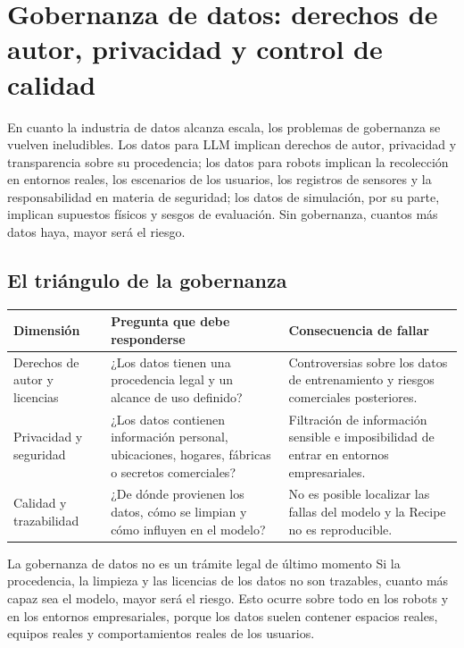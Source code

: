 \documentclass[a4paper]{article}
\begin{document}
\section{Gobernanza de datos: derechos de autor, privacidad y control de calidad}

En cuanto la industria de datos alcanza escala, los problemas de gobernanza se vuelven ineludibles. Los datos para LLM implican derechos de autor, privacidad y transparencia sobre su procedencia; los datos para robots implican la recolección en entornos reales, los escenarios de los usuarios, los registros de sensores y la responsabilidad en materia de seguridad; los datos de simulación, por su parte, implican supuestos físicos y sesgos de evaluación. Sin gobernanza, cuantos más datos haya, mayor será el riesgo.

\subsection{El triángulo de la gobernanza}

\noindent\begin{longtable}{p{}p{}p{}}
\toprule
Dimensión & Pregunta que debe responderse & Consecuencia de fallar \\
\midrule
Derechos de autor y licencias & ¿Los datos tienen una procedencia legal y un alcance de uso definido? & Controversias sobre los datos de entrenamiento y riesgos comerciales posteriores. \\
Privacidad y seguridad & ¿Los datos contienen información personal, ubicaciones, hogares, fábricas o secretos comerciales? & Filtración de información sensible e imposibilidad de entrar en entornos empresariales. \\
Calidad y trazabilidad & ¿De dónde provienen los datos, cómo se limpian y cómo influyen en el modelo? & No es posible localizar las fallas del modelo y la Recipe no es reproducible. \\
\bottomrule
\end{longtable}

\begin{warningbox}{La gobernanza de datos no es un trámite legal de último momento}
Si la procedencia, la limpieza y las licencias de los datos no son trazables, cuanto más capaz sea el modelo, mayor será el riesgo. Esto ocurre sobre todo en los robots y en los entornos empresariales, porque los datos suelen contener espacios reales, equipos reales y comportamientos reales de los usuarios.
\end{warningbox}
\end{document}
